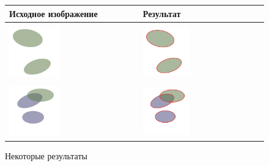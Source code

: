 \begin{figure}
\centering
\caption{\label{tab:results}Некоторые результаты}
\begin{tabular}{| l | l |}
  \hline 
  Исходное изображение & Результат \\
  \hline 
  &\\
  \includegraphics[width=0.4\textwidth]{img/s20.jpg} & \includegraphics[width=0.4\textwidth]{img/s20r.jpg} \\
  \hline 
  &\\
  \includegraphics[width=0.4\textwidth]{img/s18.jpg} & \includegraphics[width=0.4\textwidth]{img/s18r.jpg} \\

\end{tabular}
\end{figure}
